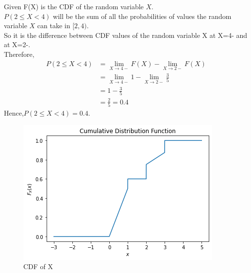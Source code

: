 
Given F(X) is the CDF of the random variable $X$.
\\$P(2\le X<4)$ will be the sum of all the probabilities of values the random variable $X$ can take in $[2,4)$.
\\So it is the difference between CDF values of the random variable X at X=4- and at X=2-.
\\Therefore,
\begin{align}
P(2\le X<4)&=\lim_{X \to 4-}{F(X)}-\lim_{X \to 2-}{F(X)}
 \\     &= \lim_{X \to 4-}{1}-\lim_{X \to 2-}{\frac{3}{5}}
 \\ &= 1-\frac{3}{5}
 \\ &=\frac{2}{5}=0.4
\end{align}
Hence,$P(2\le X<4) = 0.4$.\begin{figure}[ht]
    \centering
    \includegraphics[width=\columnwidth]{solutions/ec/58/CDF.png}
    \caption{CDF of X}
    \label{fig:my_label}
\end{figure}

